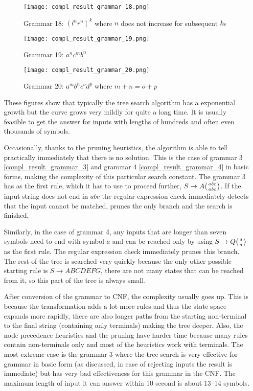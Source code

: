 \begin{figure}[h]
  \texttt{[image: compl\_result\_grammar\_18.png]}
  \caption{Grammar 18: $(l^nr^n)^k$ where $n$ does not increase for subsequent $k$s}
  \label{compl_result_grammar_18}
\end{figure}

\begin{figure}[h]
  \texttt{[image: compl\_result\_grammar\_19.png]}
  \caption{Grammar 19: $a^n c^m b^n$}
  \label{compl_result_grammar_19}
\end{figure}

\begin{figure}[h]
  \texttt{[image: compl\_result\_grammar\_20.png]}
  \caption{Grammar 20: $a^m b^n c^o d^p$ where $m+n = o+p$}
  \label{compl_result_grammar_20}
\end{figure}

These figures show that typically the tree search algorithm has a exponential growth but the curve grows very mildly for quite a long time. It is usually feasible to get the answer for inputs with lengths of hundreds and often even thousands of symbols.

Occasionally, thanks to the pruning heuristics, the algorithm is able to tell practically immediately that there is no solution. This is the case of grammar 3 \ref{compl_result_grammar_3} and grammar 4 \ref{compl_result_grammar_4} in basic forms, making the complexity of this particular search constant. The grammar 3 has as the first rule, which it has to use to proceed further, $S \rightarrow A \wkpair{abc}{abc}$. If the input string does not end in $abc$ the regular expression check immediately detects that the input cannot be matched, prunes the only branch and the search is finished.

Similarly, in the case of grammar 4, any inputs that are longer than seven symbols need to end with symbol $a$ and can be reached only by using $S \rightarrow Q \wkpair{a}{a}$ as the first rule. The regular expression check immediately prunes this branch. The rest of the tree is searched very quickly because the only other possible starting rule is $S \rightarrow A B C D E F G$, there are not many states that can be reached from it, so this part of the tree is always small.

After conversion of the grammar to CNF, the complexity usually goes up. This is because the transformation adds a lot more rules and thus the state space expands more rapidly, there are also longer paths from the starting non-terminal to the final string (containing only terminals) making the tree deeper. Also, the node precedence heuristics and the pruning have harder time because many rules contain non-terminals only and most of the heuristics work with terminals. The most extreme case is the grammar 3 where the tree search is very effective for grammar in basic form (as discussed, in case of rejecting inputs the result is immediate) but has very bad effectiveness for this grammar in the CNF. The maximum length of input it can answer within 10 second is about 13--14 symbols.

